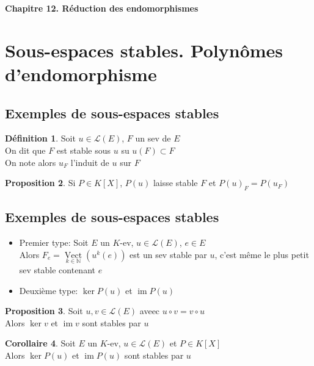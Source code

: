 \documentclass[10pt,a4paper]{article}
\theoremstyle{definition}
\newtheorem{proposition}{Proposition}[section]
\newtheorem{corollaire}[proposition]{Corollaire}
\newtheorem{definition}[proposition]{Définition}
\DeclareMathOperator*{\Vect}{Vect}
\DeclareMathOperator{\im}{im}
\begin{document}
\renewcommand{\labelitemi}{$*$}
\begin{center}
{\Large \textbf{Chapitre 12. Réduction des endomorphismes}}
\end{center}

\section{Sous-espaces stables. Polynômes d'endomorphisme}
\subsection{Exemples de sous-espaces stables}
\begin{definition}
Soit $u \in \mathcal{L}(E)$, $F$ un sev de $E$ \\
On dit que $F$ est stable sous $u$ su $u(F) \subset F$ \\
On note alors $u_F$ l'induit de $u$ sur $F$
\end{definition}
\begin{proposition}
Si $P \in K[X]$, $P(u)$ laisse stable $F$ et $\boxed{P(u)_F = P(u_F)}$
\end{proposition}

\subsection{Exemples de sous-espaces stables}
\noindent \begin{itemize}
\item Premier type: Soit $E$ un $K$-ev, $u \in \mathcal{L}(E)$, $e \in E$ \\
Alors $F_e = \Vect\limits_{k \in \mathbb{N}}(u^k(e))$ est un sev stable par $u$, c'est même le plus petit sev stable contenant $e$
\item Deuxième type: $\ker P(u)$ et $\im P(u)$
\end{itemize}
\begin{proposition}
Soit $u, v \in \mathcal{L}(E)$ aveec $u \circ v = v \circ u$ \\
Alors $\ker v$ et $\im v$ sont stables par $u$
\end{proposition}
\begin{corollaire}
Soit $E$ un $K$-ev, $u \in \mathcal{L}(E)$ et $P \in K[X]$ \\
Alors $\ker P(u)$ et $\im P(u)$ sont stables par $u$
\end{corollaire}
\end{document}
